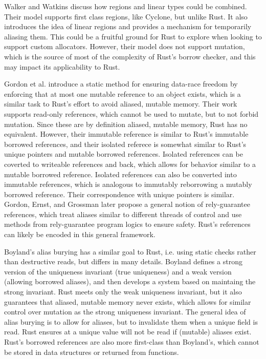 Walker and Watkins discuss how regions and linear types could be combined. \cite{regionsandlinear}
Their model supports first class regions, like Cyclone, but unlike Rust.
It also introduces the idea of linear regions and provides a mechanism for
temporarily aliasing them. This could be a fruitful ground for Rust to explore
when looking to support custom allocators.
However, their model does not support mutation, which is the source of most of the complexity
of Rust's borrow checker, and this may impact its applicability to Rust. 

Gordon et al. \cite{uniqueandrefimm} introduce a static method for ensuring data-race freedom
by enforcing that at most one mutable reference to an object exists, which is a similar task
to Rust's effort to avoid aliased, mutable memory.
Their work supports read-only references, which cannot be used to mutate, but to not forbid
mutation. Since these are by definition aliased, mutable memory, Rust has no equivalent.
However, their immutable reference is similar to Rust's immutable borrowed references,
and their isolated referece is somewhat similar to Rust's unique pointers and mutable
borrowed references. Isolated references can be coverted to writeable references and back,
which allows for behavior similar to a mutable borrowed reference. Isolated references
can also be converted into immutable references, which is analogous to immutably reborrowing
a mutably borrowed reference. Their correspondence with unique pointers is similar.
Gordon, Ernst, and Grossman \cite{relyguarantee} later propose a general notion of
rely-guarantee references, which treat aliases similar to different threads of control
and use methods from rely-guarantee program logics to ensure safety. Rust's references
can likely be encoded in this general framework.

Boyland's alias burying \cite{aliasburying} has a similar goal to Rust, i.e.
using static checks rather than destructive reads, but differs in many details.
Boyland defines a strong version of the uniqueness invariant (true uniqueness) and a weak
version (allowing borrowed aliases), and then develops a system based on maintaing
the strong invariant. Rust meets only the weak uniqueness invariant, but it also
guarantees that aliased, mutable memory never exists, which allows for similar control
over mutation as the strong uniqueness invariant. The general idea of alias burying
is to allow for aliases, but to invalidate them when a unique field is read.
Rust ensures at a unique value will not be read if (mutable) aliases exist.
Rust's borrowed references are also more first-class than Boyland's, which cannot
be stored in data structures or returned from functions.

